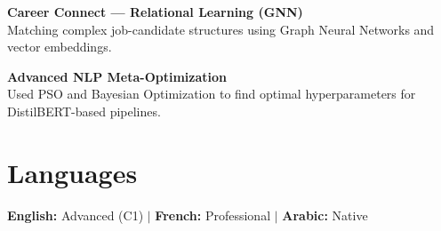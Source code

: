 \documentclass[a4paper,11pt]{article}
\begin{document}
\textbf{Career Connect — Relational Learning (GNN)} \\
Matching complex job-candidate structures using Graph Neural Networks and vector embeddings.

\textbf{Advanced NLP Meta-Optimization} \\
Used PSO and Bayesian Optimization to find optimal hyperparameters for DistilBERT-based pipelines.

\section{Languages}
\textbf{English:} Advanced (C1) $|$ \textbf{French:} Professional $|$ \textbf{Arabic:} Native
\end{document}
